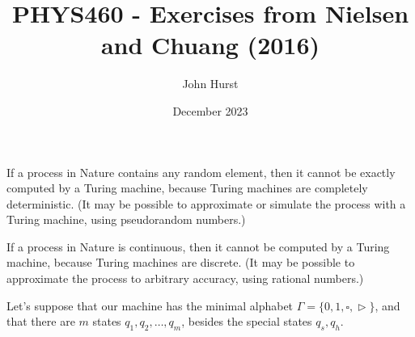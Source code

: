 \documentclass[12pt]{extarticle}
\title{PHYS460 - Exercises from Nielsen and Chuang (2016)}
\author{John Hurst}
\date{December 2023}
\begin{document}
\maketitle



If a process in Nature contains any random element, then it cannot be exactly computed by a Turing machine, because Turing machines are completely deterministic.
(It may be possible to approximate or simulate the process with a Turing machine, using pseudorandom numbers.)

If a process in Nature is continuous, then it cannot be computed by a Turing machine, because Turing machines are discrete.
(It may be possible to approximate the process to arbitrary accuracy, using rational numbers.)


Let's suppose that our machine has the minimal alphabet $\Gamma = \{0, 1, \square, \vartriangleright\}$,
and that there are $m$ states $q_1, q_2, \ldots, q_m$, besides the special states $q_s, q_h$.
\end{document}
